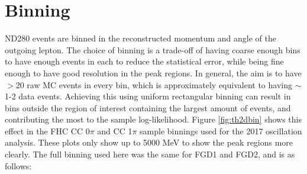 \section{Binning}\label{sec:binning}

ND280 events are binned in the reconstructed momentum and angle of the outgoing lepton. The choice of binning is a trade-off of having coarse enough bins to have enough events in each to reduce the statistical error, while being fine enough to have good resolution in the peak regions. In general, the aim is to have $>$20 raw MC events in every bin, which is approximately equivalent to having $\sim$1-2 data events. Achieving this using uniform rectangular binning can result in bins outside the region of interest containing the largest amount of events, and contributing the most to the sample log-likelihood. Figure \ref{fig:th2dbin} shows this effect in the FHC CC 0$\pi$ and CC 1$\pi$ sample binnings used for the 2017 oscillation analysis. These plots only show up to 5000 MeV to show the peak regions more clearly. The full binning used here was the same for FGD1 and FGD2, and is as follows:

